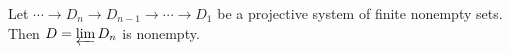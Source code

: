 Let $\cdots \to D_n \to D_{n-1} \to \cdots \to D_1$ be a projective system of finite nonempty sets. Then $D = \varprojlim D_n$ is nonempty.
